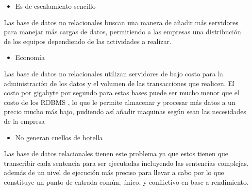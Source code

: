 \documentclass[12pt]{article}
\begin{document}
\begin{multicols}{2}
\begin{itemize}
	\item {\fontsize{9pt}{10.8pt}\selectfont Es de escalamiento sencillo\par}
\end{itemize}\par

{\fontsize{9pt}{10.8pt}\selectfont Las base de datos no relacionales buscan una manera de añadir más servidores para manejar más cargas de datos, permitiendo a las empresas una distribución de los equipos dependiendo de las actividades a realizar.\par}\par

\begin{itemize}
	\item {\fontsize{9pt}{10.8pt}\selectfont Economía\par}
\end{itemize}\par

{\fontsize{9pt}{10.8pt}\selectfont Las base de datos no relacionales utilizan servidores de bajo costo para la administración de los datos y el volumen de las transacciones que realicen. El costo por gigabyte por segundo para estas bases puede ser mucho menor que el costo de los RDBMS , lo que le permite almacenar y procesar más datos a un precio mucho más bajo, pudiendo así añadir maquinas según sean las necesidades de la empresa\par}\par

\begin{itemize}
	\item {\fontsize{9pt}{10.8pt}\selectfont No generan cuellos de botella\par}
\end{itemize}\par

{\fontsize{9pt}{10.8pt}\selectfont Las base de datos relacionales tienen este problema ya que estos tienen que transcribir cada sentencia para ser ejecutadas incluyendo las sentencias complejas, además de un nivel de ejecución más preciso para llevar a cabo por lo que constituye un punto de entrada común, único, y conflictivo en base a rendimiento.\par}\par





\end{multicols}
\end{document}
